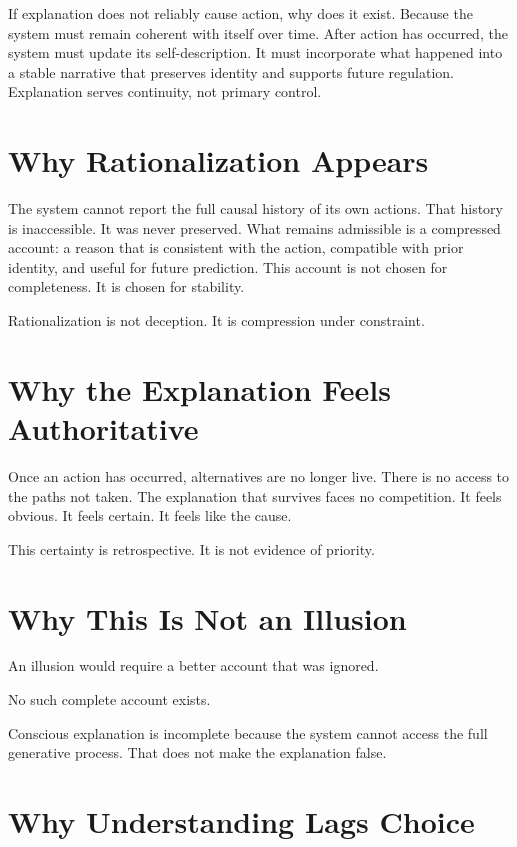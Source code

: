 \documentclass[11pt,twoside,openright]{book}
\begin{document}
If explanation does not reliably cause action, why does it exist. Because the system must remain coherent with itself over time. After action has occurred, the system must update its self-description. It must incorporate what happened into a stable narrative that preserves identity and supports future regulation. Explanation serves continuity, not primary control.

\section*{Why Rationalization Appears}

The system cannot report the full causal history of its own actions. That history is inaccessible. It was never preserved. What remains admissible is a compressed account: a reason that is consistent with the action, compatible with prior identity, and useful for future prediction. This account is not chosen for completeness. It is chosen for stability.

Rationalization is not deception. It is compression under constraint.

\section*{Why the Explanation Feels Authoritative}

Once an action has occurred, alternatives are no longer live. There is no access to the paths not taken. The explanation that survives faces no competition. It feels obvious. It feels certain. It feels like the cause.

This certainty is retrospective. It is not evidence of priority.

\section*{Why This Is Not an Illusion}

An illusion would require a better account that was ignored.

No such complete account exists.

Conscious explanation is incomplete because the system cannot access the full generative process. That does not make the explanation false.

\section*{Why Understanding Lags Choice}
\end{document}
